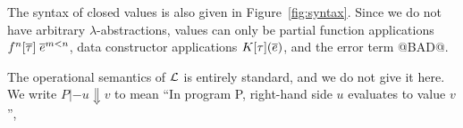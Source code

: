 The syntax of closed values is also given in Figure~\ref{fig:syntax}. Since we do not
have arbitrary $\lambda$-abstractions, values can only be partial function applications
$f^n[\overline{\tau}]\;\overline{e}^{m < n}$, data constructor applications $K[\tau](\overline{e})$,
and the error term @BAD@.

The operational semantics of $\cal L$ is entirely standard, and we do not give it here.
We write $P |- u \Downarrow v$ to mean ``In program P, right-hand side $u$ evaluates to
value $v$'',

%
